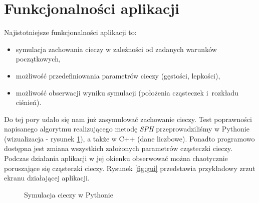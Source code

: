 
\section{Funkcjonalności aplikacji}
Najistotniejsze funkcjonalności aplikacji to:
\begin{itemize}
    \item symulacja zachowania cieczy w zależności od zadanych warunków początkowych,
    \item możliwość przedefiniowania parametrów cieczy (gęstości, lepkości),
    \item możliwość obserwacji wyniku symulacji (położenia cząsteczek i~rozkładu ciśnień).
\end{itemize}

Do tej pory udało się nam już zasymulować zachowanie cieczy. Test poprawności napisanego algorytmu realizującego metodę \textit{SPH} przeprowadziliśmy w \textsf{Pythonie} (wizualizacja - rysunek \ref{fig:python}), a także w \textsf{C++} (dane liczbowe). Ponadto programowo dostępna jest zmiana wszystkich założonych parametrów cząsteczki cieczy. Podczas działania aplikacji w jej okienku obserwować można chaotycznie poruszające się cząsteczki cieczy. Rysunek \ref{fig:gui} przedstawia przykładowy zrzut ekranu działającej aplikacji.

\begin{figure}[H] 
 \begin{center}
 \end{center}
 \caption{Symulacja cieczy w Pythonie}
 \label{fig:python}
\end{figure}
